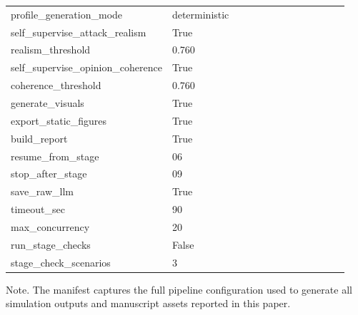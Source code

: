 \begin{table}[htbp]
{\begin{tabular}{p{0.24\linewidth}p{0.70\linewidth}}
profile\_generation\_mode & deterministic \\
self\_supervise\_attack\_realism & True \\
realism\_threshold & 0.760 \\
self\_supervise\_opinion\_coherence & True \\
coherence\_threshold & 0.760 \\
generate\_visuals & True \\
export\_static\_figures & True \\
build\_report & True \\
resume\_from\_stage & 06 \\
stop\_after\_stage & 09 \\
save\_raw\_llm & True \\
timeout\_sec & 90 \\
max\_concurrency & 20 \\
run\_stage\_checks & False \\
stage\_check\_scenarios & 3 \\
\bottomrule
\end{tabular}
}
\par\smallskip
{\normalsize Note. The manifest captures the full pipeline configuration used to generate all simulation outputs and manuscript assets reported in this paper.}
\end{table}